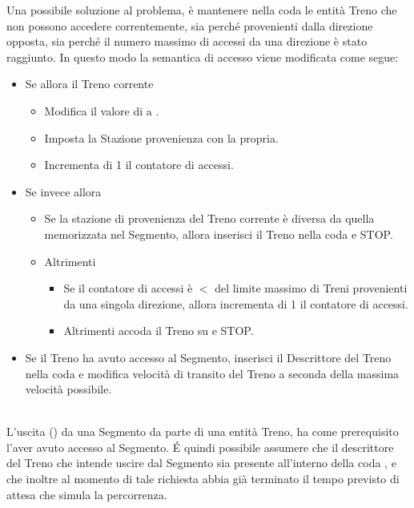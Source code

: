 \begin{description}
			Una possibile soluzione al problema, è mantenere nella coda   le entità Treno che non possono accedere correntemente, sia perché provenienti dalla direzione opposta, sia perché il numero massimo di accessi da una direzione è stato raggiunto. In questo modo la semantica di accesso viene modificata come segue:
				\begin{itemize}
					\item Se  allora il Treno corrente 
						\begin{itemize}
							\item Modifica il valore di  a .
							\item Imposta la Stazione provenienza con la propria.
							\item Incrementa di 1 il contatore di accessi.
						\end{itemize}
					\item Se invece  allora
						\begin{itemize}
							\item Se la stazione di provenienza del Treno corrente è diversa da quella memorizzata nel Segmento, allora inserisci il Treno nella coda  e STOP.
							\item Altrimenti 
								\begin{itemize}
									\item Se il contatore di accessi è $ < $ del limite massimo di Treni provenienti da una singola direzione, allora incrementa di 1 il contatore di accessi.
									\item Altrimenti accoda il Treno su  e STOP.
								\end{itemize}
						\end{itemize}
					\item Se il Treno ha avuto accesso al Segmento, inserisci il Descrittore del Treno nella coda  e modifica velocità di transito del Treno a seconda della massima velocità possibile.
				\end{itemize}
			  
			\item {} \\ 
			
			L'uscita () da una Segmento da parte di una entità Treno, ha come prerequisito l'aver avuto accesso al Segmento. \'E quindi possibile assumere che il descrittore del Treno che intende uscire dal Segmento sia presente all'interno della coda , e che inoltre al momento di tale richiesta abbia già terminato il tempo previsto di attesa che simula la percorrenza.
			

\end{description}
